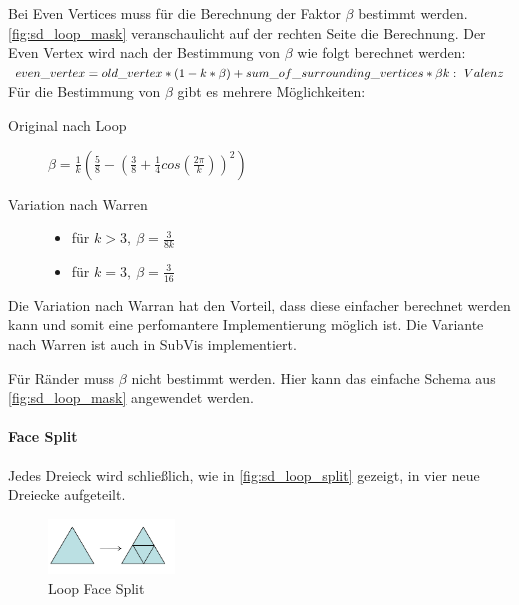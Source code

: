 Bei Even Vertices muss für die Berechnung der Faktor \(\beta\) bestimmt werden.
\autoref{fig:sd_loop_mask} veranschaulicht auf der rechten Seite die Berechnung.
Der Even Vertex wird nach der Bestimmung von \(\beta\) wie folgt berechnet werden:\\
\(
even\_vertex = old\_vertex * (1 - k * \beta) + sum\_of\_surrounding\_vertices * \beta\\
k:\ Valenz
\)
\\
Für die Bestimmung von \(\beta\) gibt es mehrere Möglichkeiten:
\begin{description}
\item[Original nach Loop]  \(\beta=\frac{1}{k}(\frac{5}{8}-(\frac{3}{8}+\frac{1}{4}cos(\frac{2\pi}{k}))^2)\)
\item[Variation nach Warren] \mbox{}
	\begin{itemize}
		\item für \(k > 3,\ \beta = \frac{3}{8k}\)
		\item für \(k = 3,\ \beta = \frac{3}{16}\)	
	\end{itemize}
\end{description}
Die Variation nach Warran hat den Vorteil, dass diese einfacher berechnet werden kann
und somit eine perfomantere Implementierung möglich ist.
Die Variante nach Warren ist auch in SubVis implementiert.

Für Ränder muss \(\beta\) nicht bestimmt werden.
Hier kann das einfache Schema aus \autoref{fig:sd_loop_mask} angewendet werden.
\cite{Carnegie}
\cite{Standford.Loop}
\cite[S. 70 f.]{Zorin.subdivcourse}

\paragraph*{Face Split}

Jedes Dreieck wird schließlich, wie in \autoref{fig:sd_loop_split} gezeigt, in vier neue Dreiecke aufgeteilt.

\begin{figure}
\centering
\includegraphics[width=0.3\textwidth]{content/media/sd_loop_split.png}
\caption{Loop Face Split \cite[S. 56 f.]{Standford.24.07.2015}}
\label{fig:sd_loop_split}
\end{figure}

